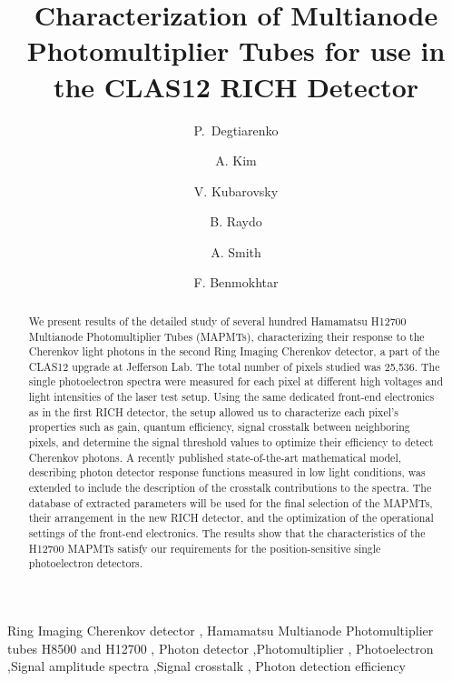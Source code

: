 \documentclass[5p,times,preprint]{elsarticle}
\begin{document}
\begin{frontmatter}
\title{Characterization of Multianode Photomultiplier Tubes for use in the CLAS12 RICH Detector}

\author[A]{P.~Degtiarenko }
\author[B]{A. Kim } 
\author[A]{V. Kubarovsky }
\author[A]{B. Raydo}
\author[C]{A. Smith}
\author[D]{F. Benmokhtar}



\address[A]{Thomas Jefferson National Accelerator Facility, Newport News, VA 23606, USA}
\address[B]{University of Connecticut, Storrs, CT 06269, USA}
\address[C]{Duke University, Durham, NC 27705, USA}
\address[D]{Duquesne University, Pittsburgh, PA, 15282, USA}



\begin{abstract}
We present results of the detailed study of several hundred Hamamatsu H12700 Multianode Photomultiplier Tubes (MAPMTs), characterizing their response to the Cherenkov light photons in the second Ring Imaging Cherenkov detector, a part of the CLAS12 upgrade at Jefferson Lab.
The total number of pixels studied was 25,536.
The single photoelectron spectra were measured for each pixel at different high voltages and  light intensities of the laser test setup. Using the same dedicated front-end electronics as in the first RICH detector, the setup allowed us to characterize each pixel's properties such as gain, quantum efficiency, signal crosstalk between neighboring pixels,
and determine the signal threshold values to optimize their efficiency to detect Cherenkov photons.
A recently published state-of-the-art mathematical model, describing photon detector response functions measured in low light conditions, was extended to include the description of the crosstalk contributions to the spectra.
The database of extracted parameters will be used for the final selection of the MAPMTs, their arrangement in the new RICH detector, and the optimization of the operational settings of the front-end electronics.
The results show that the characteristics of the H12700 MAPMTs satisfy our requirements for the position-sensitive single photoelectron detectors.
\end{abstract}

\begin{keyword}
Ring Imaging Cherenkov detector \sep
Hamamatsu Multianode Photomultiplier tubes H8500 and H12700 \sep
Photon detector \sep Photomultiplier \sep
Photoelectron \sep  Signal amplitude spectra \sep Signal crosstalk \sep
Photon detection efficiency
\end{keyword}


\end{frontmatter}
\end{document}
